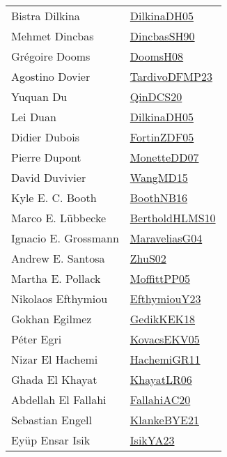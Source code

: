 {\begin{longtable}{p{4cm}p{20cm}}
Bistra Dilkina & \href{papers/DilkinaDH05.pdf}{DilkinaDH05}\cite{DilkinaDH05} \\
Mehmet Dincbas & \href{articles/DincbasSH90.pdf}{DincbasSH90}\cite{DincbasSH90} \\
Gr{\'{e}}goire Dooms & \href{papers/DoomsH08.pdf}{DoomsH08}\cite{DoomsH08} \\
Agostino Dovier & \href{papers/TardivoDFMP23.pdf}{TardivoDFMP23}\cite{TardivoDFMP23} \\
Yuquan Du & \href{articles/QinDCS20.pdf}{QinDCS20}\cite{QinDCS20} \\
Lei Duan & \href{papers/DilkinaDH05.pdf}{DilkinaDH05}\cite{DilkinaDH05} \\
Didier Dubois & \href{papers/FortinZDF05.pdf}{FortinZDF05}\cite{FortinZDF05} \\
Pierre Dupont & \href{papers/MonetteDD07.pdf}{MonetteDD07}\cite{MonetteDD07} \\
David Duvivier & \href{articles/WangMD15.pdf}{WangMD15}\cite{WangMD15} \\
Kyle E. C. Booth & \href{papers/BoothNB16.pdf}{BoothNB16}\cite{BoothNB16} \\
Marco E. L{\"{u}}bbecke & \href{papers/BertholdHLMS10.pdf}{BertholdHLMS10}\cite{BertholdHLMS10} \\
Ignacio E. Grossmann & \href{papers/MaraveliasG04.pdf}{MaraveliasG04}\cite{MaraveliasG04} \\
Andrew E. Santosa & \href{papers/ZhuS02.pdf}{ZhuS02}\cite{ZhuS02} \\
Martha E. Pollack & \href{papers/MoffittPP05.pdf}{MoffittPP05}\cite{MoffittPP05} \\
Nikolaos Efthymiou & \href{papers/EfthymiouY23.pdf}{EfthymiouY23}\cite{EfthymiouY23} \\
Gokhan Egilmez & \href{articles/GedikKEK18.pdf}{GedikKEK18}\cite{GedikKEK18} \\
P{\'{e}}ter Egri & \href{papers/KovacsEKV05.pdf}{KovacsEKV05}\cite{KovacsEKV05} \\
Nizar El Hachemi & \href{articles/HachemiGR11.pdf}{HachemiGR11}\cite{HachemiGR11} \\
Ghada El Khayat & \href{articles/KhayatLR06.pdf}{KhayatLR06}\cite{KhayatLR06} \\
Abdellah El Fallahi & \href{}{FallahiAC20}\cite{FallahiAC20} \\
Sebastian Engell & \href{papers/KlankeBYE21.pdf}{KlankeBYE21}\cite{KlankeBYE21} \\
Ey{\"{u}}p Ensar Isik & \href{articles/IsikYA23.pdf}{IsikYA23}\cite{IsikYA23} \\

\end{longtable}}
